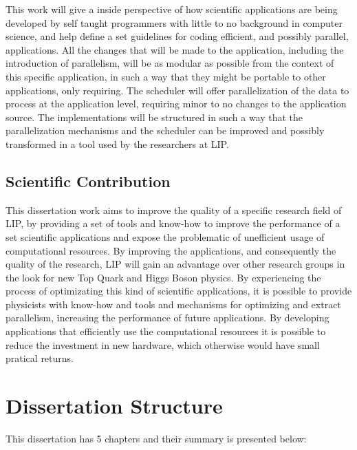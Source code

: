 This work will give a inside perspective of how scientific applications are being developed by self taught programmers with little to no background in computer science, and help define a set guidelines for coding efficient, and possibly parallel, applications. All the changes that will be made to the \tth application, including the introduction of parallelism, will be as modular as possible from the context of this specific application, in such a way that they might be portable to other applications, only requiring. The scheduler will offer parallelization of the data to process at the application level, requiring minor to no changes to the application source. The implementations will be structured in such a way that the parallelization mechanisms and the scheduler can be improved and possibly transformed in a tool used by the researchers at LIP.

\subsection{Scientific Contribution}
\label{ScientificContribution}

This dissertation work aims to improve the quality of a specific research field of LIP, by providing a set of tools and know-how to improve the performance of a set scientific applications and expose the problematic of unefficient usage of computational resources. By improving the applications, and consequently the quality of the research, LIP will gain an advantage over other research groups in the look for new Top Quark and Higgs Boson physics. By experiencing the process of optimizating this kind of scientific applications, it is possible to provide physicists with know-how and tools and mechanisms for optimizing and extract parallelism, increasing the performance of future applications. By developing applications that efficiently use the computational resources it is possible to reduce the investment in new hardware, which otherwise would have small pratical returns.

\section{Dissertation Structure}
\label{DissertationStructure}

This dissertation has 5 chapters and their summary is presented below:

